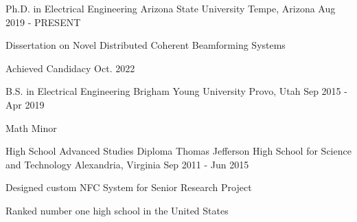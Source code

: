 

\begin{cventries}

    \cventry
    {Ph.D. in Electrical Engineering} %
    {Arizona State University} %
    {Tempe, Arizona} %
    {Aug 2019 - PRESENT} %
    {
        \begin{cvitems} %
        \item {Dissertation on Novel Distributed Coherent Beamforming Systems}
        \item {Achieved Candidacy Oct. 2022}
        \end{cvitems}
    }

    \cventry
    {B.S. in Electrical Engineering} %
    {Brigham Young University} %
    {Provo, Utah} %
    {Sep 2015 - Apr 2019} %
    {
        \begin{cvitems} %
        \item {Math Minor}
        \end{cvitems}
    }

    \cventry
    {High School Advanced Studies Diploma} %
    {Thomas Jefferson High School for Science and Technology} %
    {Alexandria, Virginia} %
    {Sep 2011 - Jun 2015} %
    {
        \begin{cvitems} %
        \item {Designed custom NFC System for Senior Research Project}
        \item {Ranked number one high school in the United States}
        \end{cvitems}
    }

\end{cventries}

